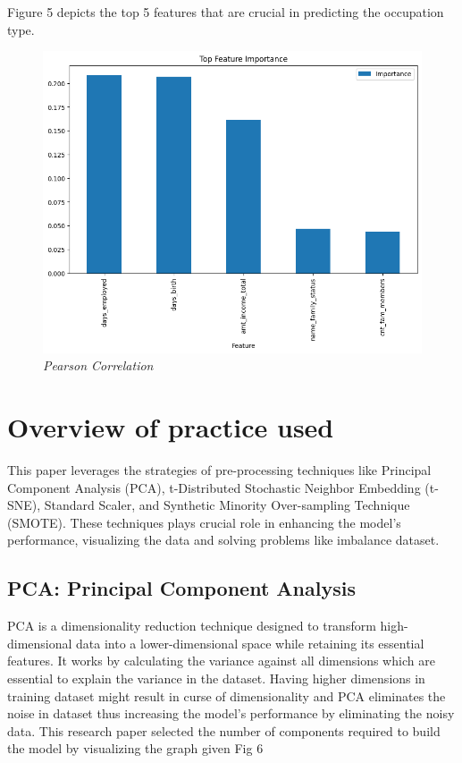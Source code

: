 \documentclass[10pt]{article}
\begin{document}
\begin{multicols}{2}
Figure 5 depicts the top 5 features that are crucial in predicting the occupation type.  
\begin{figure}[H]
    \centering
    \includegraphics[width=1\linewidth]{figure5.png}
    \caption{\justifying \textit{Pearson Correlation}}
    \label{fig:PID Fuzzy}
\end{figure}


\section{Overview of practice used}
This paper leverages the strategies of pre-processing techniques like Principal Component Analysis (PCA), t-Distributed Stochastic Neighbor Embedding (t-SNE), Standard Scaler, and Synthetic Minority Over-sampling Technique (SMOTE). These techniques plays crucial role in enhancing the model’s performance, visualizing the data and solving problems like imbalance dataset. 

\subsection{PCA: Principal Component Analysis}
PCA is a dimensionality reduction technique designed to transform high-dimensional data into a lower-dimensional space while retaining its essential features. It works by calculating the variance against all dimensions which are essential to explain the variance in the dataset. Having higher dimensions in training dataset might result in curse of dimensionality and PCA eliminates the noise in dataset thus increasing the model’s performance by eliminating the noisy data. This research paper selected the number of components required to build the model by visualizing the graph given Fig 6


\end{multicols}
\end{document}
